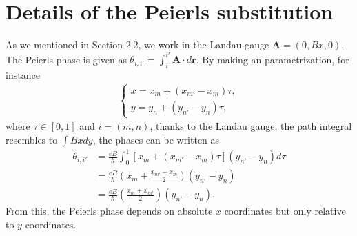 \documentclass{report}
\begin{document}
\chapter{Details of the Peierls substitution} \label{appendix a}
As we mentioned in Section 2.2, we work in the Landau gauge $\mathbf{A} = (0,Bx,0)$. The Peierls phase is given as $\theta_{i,i'} = \int_{i}^{i'}\mathbf{A} \cdot d\mathbf{r}$. By making an parametrization, for instance
\begin{gather}
	\begin{cases}
		x = x_{m} + (x_{m'} - x_{m}) \tau, \\
		y = y_{n} + (y_{n'} - y_{n}) \tau,
	\end{cases}
\end{gather}
where $\tau \in \left[0,1\right]$ and $i = (m,n)$, thanks to the Landau gauge, the path integral resembles to $\int Bx dy$, the phases can be written as
\begin{equation}
	\begin{aligned}
		\theta_{i,i'} &= \frac{eB}{\hbar} \int_{0}^{1} \left[ x_{m} + (x_{m'} - x_{m}) \tau \right] (y_{n'} - y_{n}) d\tau \\
		&= \frac{eB}{\hbar}(x_{m} + \frac{x_{m'} - x_{m}}{2})(y_{n'} - y_{n}) \\
		&= \frac{eB}{\hbar}\left(\frac{x_{m} + x_{m'}}{2}\right)(y_{n'} - y_{n}).
	\end{aligned}
\end{equation}
From this, the Peierls phase depends on absolute $x$ coordinates but only relative to $y$ coordinates.
\end{document}
